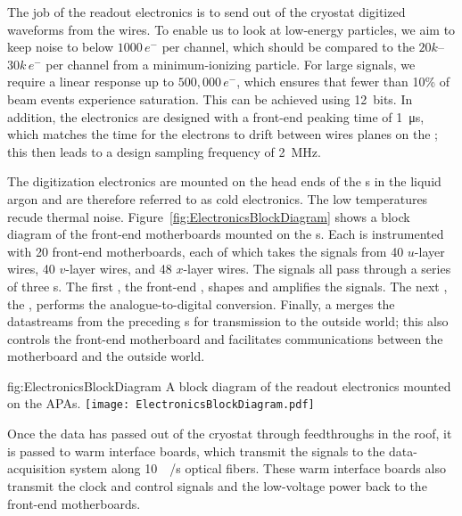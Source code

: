 The job of the readout electronics is to send out of the cryostat digitized waveforms from the  wires. To enable us to look at low-energy particles, we aim to keep noise to below $1000\,e^{-}$ per channel, which should be compared to the $20k$--$30k\,e^{-}$ per channel from a minimum-ionizing particle. For large signals, we require a linear response up to $500,000\,e^{-}$, which ensures that fewer than 10\% of beam events experience saturation. This can be achieved using 12\,  bits. In addition, the electronics are designed with a front-end peaking time of \SI{1}{\micro\second}, which matches the time for the electrons to drift between wires planes on the ; this then leads to a design sampling frequency of \SI{2}{\mega\hertz}.

The digitization electronics are mounted on the head ends of the s in the liquid argon and are therefore referred to as cold electronics. The low temperatures recude thermal noise. Figure~\ref{fig:ElectronicsBlockDiagram} shows a block diagram of the front-end motherboards mounted on the s. Each  is instrumented with 20 front-end motherboards, each of which takes the signals from 40 $u$-layer wires, 40 $v$-layer wires, and 48 $x$-layer wires. The signals all pass through a series of three s. The first , the front-end , shapes and amplifies the signals. The next , the  , performs the analogue-to-digital conversion. Finally, a   merges the datastreams from the preceding s for transmission to the outside world; this   also controls the front-end motherboard and facilitates communications between the motherboard and the outside world.

\begin{dunefigure}{fig:ElectronicsBlockDiagram}
{A block diagram of the readout electronics mounted on the APAs.}
\texttt{[image: ElectronicsBlockDiagram.pdf]}
\end{dunefigure}

Once the data has passed out of the cryostat through feedthroughs in the roof, it is passed to warm interface boards, which transmit the signals to the data-acquisition system along \SI{10}{\giga\byte/\second} optical fibers. These warm interface boards also transmit the clock and control signals and the low-voltage power back to the front-end motherboards.

